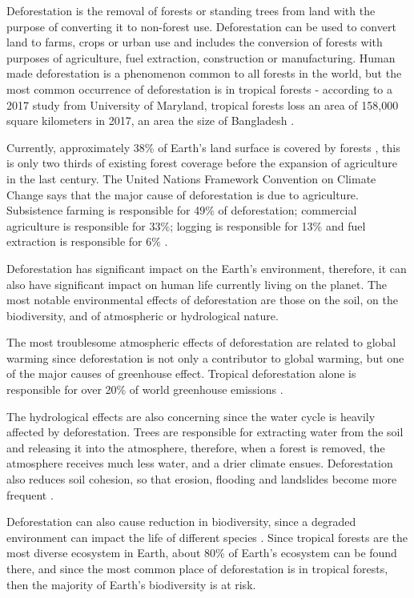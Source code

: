 Deforestation is the removal of forests or standing trees from land
with the purpose of converting it to non-forest use. Deforestation can be used to convert land to farms,
crops or urban use and includes the conversion of forests with purposes of agriculture, fuel extraction,
construction or manufacturing. Human made deforestation is a phenomenon common to all forests in the world, but
the most common occurrence of deforestation is in tropical forests \cite{Alina} - according to a 2017 study from University of Maryland,
tropical forests loss an area of 158,000 square kilometers in 2017, an area the size of Bangladesh \cite{maryland}.

Currently, approximately 38\% of Earth's land surface is covered by forests \cite{WWF}, this is only two thirds of existing
forest coverage before the expansion of agriculture in the last century\cite{WID}. The United Nations Framework Convention on Climate Change
says that the major cause of deforestation is due to agriculture. Subsistence farming is responsible for 49\% of deforestation; commercial agriculture
is responsible for 33\%; logging is responsible for 13\% and fuel extraction is responsible for 6\% \cite{UNFCCC}.

Deforestation has significant impact on the Earth's environment, therefore, it can also have significant impact on human life currently living on the planet.
The most notable environmental effects of deforestation are those on the soil, on the biodiversity, and of atmospheric or hydrological nature.

The most troublesome atmospheric effects of deforestation are related to global warming since deforestation is not only a contributor to global warming, but
one of the major causes of greenhouse effect. Tropical deforestation alone is responsible for over 20\% of world greenhouse emissions \cite{Chirac}.

The hydrological effects are also concerning since the water cycle is heavily affected by deforestation. Trees are responsible for extracting water from the soil
and releasing it into the atmosphere, therefore, when a forest is removed, the atmosphere receives much less water, and a drier climate ensues. Deforestation also reduces soil cohesion,
so that erosion, flooding and landslides become more frequent \cite{Rogge}.

Deforestation can also cause reduction in biodiversity, since a degraded environment can impact the life of different species \cite{umich}. Since
tropical forests are the most diverse ecosystem in Earth, about 80\% of Earth's ecosystem can be found there, and since the most common place of deforestation
is in tropical forests, then the majority of Earth's biodiversity is at risk\cite{Mogato}.

